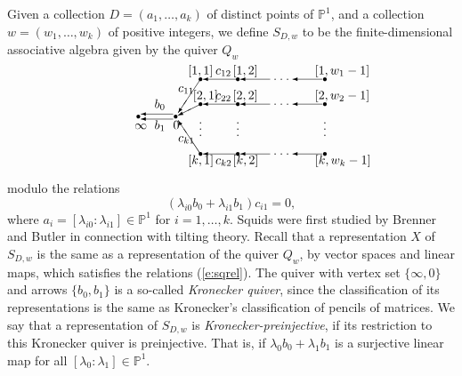 \documentclass{amsart}
\theoremstyle{plain}
\theoremstyle{definition}
\theoremstyle{remark}
\newcommand{\PP}{\mathbb{P}}
\begin{document}
Given a collection $D = (a_1,\dots,a_k)$ of distinct points of $\PP^1$,
and a collection $w=(w_1,\dots,w_k)$ of positive integers, we define
$S_{D,w}$ to be the finite-dimensional associative algebra
given by the quiver $Q_w$
\setlength{\unitlength}{1.5pt}
\[
\begin{picture}(110,80)
\put(-20,40){\circle*{2.5}}
\put(10,40){\circle*{2.5}}
\put(30,10){\circle*{2.5}}
\put(30,50){\circle*{2.5}}
\put(30,70){\circle*{2.5}}
\put(60,10){\circle*{2.5}}
\put(60,50){\circle*{2.5}}
\put(60,70){\circle*{2.5}}
\put(130,10){\circle*{2.5}}
\put(130,50){\circle*{2.5}}
\put(130,70){\circle*{2.5}}
%
\put(8,38){\vector(-1,0){26}}
\put(8,42){\vector(-1,0){26}}
%
\put(30,70){\vector(-2,-3){18}}
\put(30,50){\vector(-2,-1){18}}
\put(30,10){\vector(-2,3){18}}
\put(60,10){\vector(-1,0){28}}
\put(60,50){\vector(-1,0){28}}
\put(60,70){\vector(-1,0){28}}
\put(86,10){\vector(-1,0){24}}
\put(86,50){\vector(-1,0){24}}
\put(86,70){\vector(-1,0){24}}
\put(128,10){\vector(-1,0){24}}
\put(128,50){\vector(-1,0){24}}
\put(128,70){\vector(-1,0){24}}
\put(90,10){\circle*{1}}
\put(95,10){\circle*{1}}
\put(100,10){\circle*{1}}
\put(90,50){\circle*{1}}
\put(95,50){\circle*{1}}
\put(100,50){\circle*{1}}
\put(90,70){\circle*{1}}
\put(95,70){\circle*{1}}
\put(100,70){\circle*{1}}
\put(30,25){\circle*{1}}
\put(30,30){\circle*{1}}
\put(30,35){\circle*{1}}
\put(60,25){\circle*{1}}
\put(60,30){\circle*{1}}
\put(60,35){\circle*{1}}
\put(130,25){\circle*{1}}
\put(130,30){\circle*{1}}
\put(130,35){\circle*{1}}
%
\put(8,30){0}
\put(-23,30){$\infty$}
\put(-7,47){$b_0$}
\put(-7,30){$b_1$}
\put(12,60){$c_{11}$}
\put(12,20){$c_{k1}$}
%
\put(20,2){$[k,1]$}
\put(24,54){$[2,1]$}
\put(20,74){$[1,1]$}
\put(56,2){$[k,2]$}
\put(56,54){$[2,2]$}
\put(56,74){$[1,2]$}
\put(122,2){$[k,w_k-1]$}
\put(122,54){$[2,w_2-1]$}
\put(122,74){$[1,w_1-1]$}
%
\put(42,2){$c_{k2}$}
\put(42,54){$c_{22}$}
\put(42,74){$c_{12}$}
\end{picture}
\]
modulo the relations
%
\begin{equation}\label{e:sqrel}
(\lambda_{i0} b_0 + \lambda_{i1} b_1)c_{i1}=0,
\end{equation}
%
where $a_i = [\lambda_{i0}:\lambda_{i1}]\in\PP^1$ for $i=1,\dots,k$.
Squids were first studied by Brenner and Butler \cite{BB} in connection with tilting theory.
Recall that a representation $X$ of $S_{D,w}$ is the same as a representation
of the quiver $Q_w$, by vector spaces and linear maps, which satisfies the
relations (\ref{e:sqrel}). The quiver with vertex set $\{\infty,0\}$
and arrows $\{b_0,b_1\}$ is a so-called \emph{Kronecker quiver}, since the
classification of its representations is the same as Kronecker's
classification of pencils of matrices.
We say that a representation of $S_{D,w}$ is \emph{Kronecker-preinjective},
if its restriction to this Kronecker quiver
is preinjective. That is, if $\lambda_0 b_0+\lambda_1 b_1$ is a surjective
linear map for all $[\lambda_0:\lambda_1]\in\PP^1$.
\end{document}

